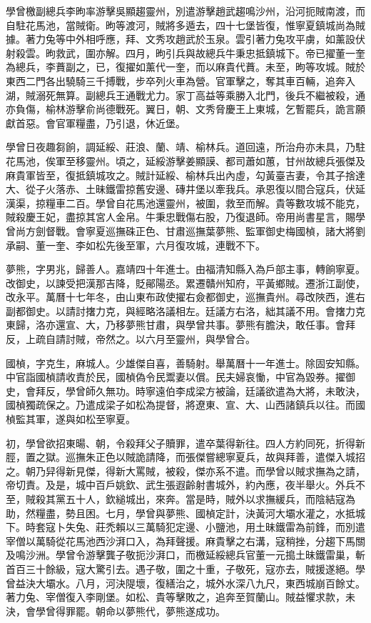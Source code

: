 \begin{pinyinscope}
學曾檄副總兵李昫率游擊吳顯趨靈州，別遣游擊趙武趨鳴沙州，沿河扼賊南渡，而自駐花馬池，當賊衛。昫等渡河，賊將多遁去，四十七堡皆復，惟寧夏鎮城尚為賊據。著力兔等中外相呼應，拜、文秀攻趙武於玉泉。雲引著力兔攻平虜，如薰設伏射殺雲。昫救武，圍亦解。四月，昫引兵與故總兵牛秉忠抵鎮城下。帝已擢董一奎為總兵，李蕡副之，已，復擢如薰代一奎，而以麻貴代蕡。未至，昫等攻城。賊於東西二門各出驍騎三千搏戰，步卒列火車為營。官軍擊之，奪其車百輛，追奔入湖，賊溺死無算。副總兵王通戰尤力。家丁高益等乘勝入北門，後兵不繼被殺，通亦負傷，榆林游擊俞尚德戰死。翼日，朝、文秀脅慶王上東城，乞暫罷兵，詭言願獻首惡。會官軍糧盡，乃引退，休近堡。

學曾日夜趣芻餉，調延綏、莊浪、蘭、靖、榆林兵。道回遠，所治舟亦未具，乃駐花馬池，俟軍至移靈州。頃之，延綏游擊姜顯謨、都司蕭如蕙，甘州故總兵張傑及麻貴軍皆至，復抵鎮城攻之。賊計延綏、榆林兵出內虛，勾黃臺吉妻，令其子捨達大、從子火落赤、土昧鐵雷掠舊安邊、磚井堡以牽我兵。承恩復以間合寇兵，伏延漢渠，掠糧車二百。學曾自花馬池還靈州，被圍，救至而解。貴等數攻城不能克，賊殺慶王妃，盡掠其宮人金帛。牛秉忠戰傷右股，乃復退師。帝用尚書星言，賜學曾尚方劍督戰。會寧夏巡撫硃正色、甘肅巡撫葉夢熊、監軍御史梅國楨，諸大將劉承嗣、董一奎、李如松先後至軍，六月復攻城，連戰不下。

夢熊，字男兆，歸善人。嘉靖四十年進士。由福清知縣入為戶部主事，轉餉寧夏。改御史，以諫受把漢那吉降，貶鄖陽丞。累遷贛州知府，平黃鄉賊。遷浙江副使，改永平。萬曆十七年冬，由山東布政使擢右僉都御史，巡撫貴州。尋改陜西，進右副都御史。以請討撦力克，與經略洛議相左。廷議方右洛，絀其議不用。會撦力克東歸，洛亦還宣、大，乃移夢熊甘肅，與學曾共事。夢熊有膽決，敢任事。會拜反，上疏自請討賊，帝然之。以六月至靈州，與學曾合。

國楨，字克生，麻城人。少雄傑自喜，善騎射。舉萬曆十一年進士。除固安知縣。中官詣國楨請收責於民，國楨偽令民鬻妻以償。民夫婦哀慟，中官為毀券。擢御史，會拜反，學曾師久無功。時寧遠伯李成梁方被論，廷議欲遣為大將，未敢決，國楨獨疏保之。乃遣成梁子如松為提督，將遼東、宣、大、山西諸鎮兵以往。而國楨監其軍，遂與如松至寧夏。

初，學曾欲招東暘、朝，令殺拜父子贖罪，遣卒葉得新往。四人方約同死，折得新脛，置之獄。巡撫朱正色以賊詭請降，而張傑嘗總寧夏兵，故與拜善，遣傑入城招之。朝乃舁得新見傑，得新大罵賊，被殺，傑亦系不遣。而學曾以賊求撫為之請，帝切責。及是，城中百戶姚欽、武生張遐齡射書城外，約內應，夜半舉火。外兵不至，賊殺其黨五十人，欽縋城出，來奔。當是時，賊外以求撫緩兵，而陰結寇為助，然糧盡，勢且困。七月，學曾與夢熊、國楨定計，決黃河大壩水灌之，水抵城下。時套寇卜失兔、莊禿賴以三萬騎犯定邊、小鹽池，用土昧鐵雷為前鋒，而別遣宰僧以萬騎從花馬池西沙湃口入，為拜聲援。麻貴擊之右溝，寇稍挫，分趨下馬關及鳴沙洲。學曾令游擊龔子敬扼沙湃口，而檄延綏總兵官董一元搗土昧鐵雷巢，斬首百三十餘級，寇大驚引去。遇子敬，圍之十重，子敬死，寇亦去，賊援遂絕。學曾益決大壩水。八月，河決隄壞，復繕治之，城外水深八九尺，東西城崩百餘丈。著力兔、宰僧復入李剛堡。如松、貴等擊敗之，追奔至賀蘭山。賊益懼求款，未決，會學曾得罪罷。朝命以夢熊代，夢熊遂成功。


\end{pinyinscope}
